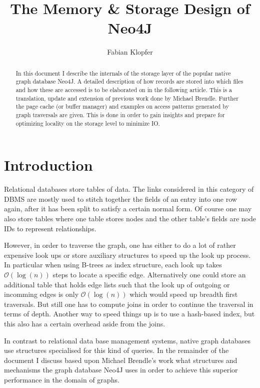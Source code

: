 \documentclass[a4paper,10pt]{article}
\title{The Memory \& Storage Design of Neo4J}
\author{Fabian Klopfer}
\begin{document}
\maketitle
\vspace{2cm}

\begin{abstract}
In this document I describe the internals of the storage layer of the popular native graph database Neo4J. A detailed description of how records are stored into which files and how these are accessed is to be elaborated on in the following article. This is a translation, update and extension of previous work done by Michael Brendle. Further the page cache (or buffer manager) and examples on access patterns generated by graph traversals are given. This is done in order to gain insights and prepare for optimizing locality on the storage level to minimize IO.
\end{abstract} \newpage

\tableofcontents \newpage

\section{Introduction}
Relational databases store tables of data. The links considered in this category of DBMS are mostly used to stitch together the fields of an entry into one row again, after it has been split to satisfy a certain normal form. Of course one may also store tables where one table stores nodes and the other table's fields are node IDs to represent relationships.

However, in order to traverse the graph, one has either to do a lot of rather expensive look ups or store auxiliary structures to speed up the look up process. In particular when using B-trees as index structure, each look up takes $\mathcal{O}(\log(n))$ steps to locate a specific edge. Alternatively one could store an additional table that holds edge lists such that the look up of outgoing or incomming edges is only $\mathcal{O}(\log(n))$ which would speed up breadth first traversals. But still one has to compute joins in order to continue the traversal in terms of depth. Another way to speed things up is to use a hash-based index, but this also has a certain overhead aside from the joins.

In contrast to relational data base management systems, native graph databases use structures specialised for this kind of queries. In the remainder of the document I discuss based upon Michael Brendle's work what structures and mechanisms the graph database Neo4J uses in order to achieve this superior performance in the domain of graphs.
\end{document}
